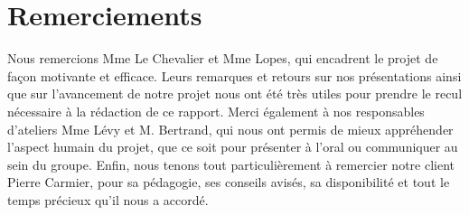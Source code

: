 \section*{Remerciements}

Nous remercions Mme Le Chevalier et Mme Lopes, qui encadrent
le projet de façon motivante et efficace.
Leurs remarques et retours sur nos présentations 
ainsi que sur l'avancement de notre projet
nous ont été très utiles pour prendre le recul
nécessaire à la rédaction de ce rapport.
Merci également à nos responsables d'ateliers Mme Lévy et M. Bertrand, qui nous ont permis de mieux appréhender l'aspect humain du projet, que ce soit pour présenter à l'oral ou communiquer au sein du groupe.
Enfin, nous tenons tout particulièrement à remercier notre client Pierre Carmier, pour sa pédagogie, ses conseils avisés, sa disponibilité et tout le temps précieux qu'il nous a accordé.